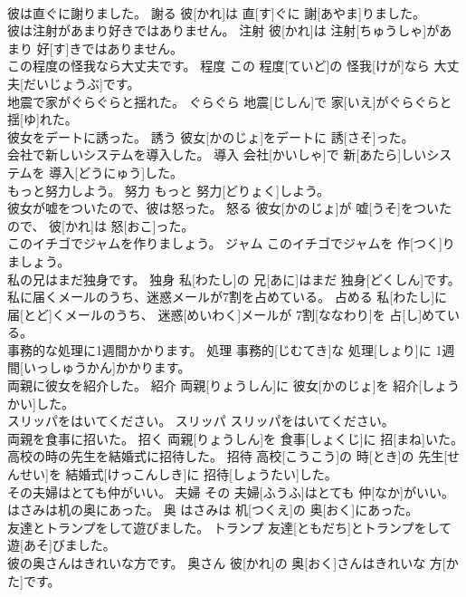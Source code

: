 \documentclass[8pt]{extreport}
\begin{document}
\begin{CJK}{UTF8}{min}
\\	彼は直ぐに謝りました。	謝る	彼[かれ]は 直[す]ぐに 謝[あやま]りました。	
\\	彼は注射があまり好きではありません。	注射	彼[かれ]は 注射[ちゅうしゃ]があまり 好[す]きではありません。	
\\	この程度の怪我なら大丈夫です。	程度	この 程度[ていど]の 怪我[けが]なら 大丈夫[だいじょうぶ]です。	
\\	地震で家がぐらぐらと揺れた。	ぐらぐら	地震[じしん]で 家[いえ]がぐらぐらと 揺[ゆ]れた。	
\\	彼女をデートに誘った。	誘う	彼女[かのじょ]をデートに 誘[さそ]った。	
\\	会社で新しいシステムを導入した。	導入	会社[かいしゃ]で 新[あたら]しいシステムを 導入[どうにゅう]した。	
\\	もっと努力しよう。	努力	もっと 努力[どりょく]しよう。	
\\	彼女が嘘をついたので、彼は怒った。	怒る	彼女[かのじょ]が 嘘[うそ]をついたので、 彼[かれ]は 怒[おこ]った。	
\\	このイチゴでジャムを作りましょう。	ジャム	このイチゴでジャムを 作[つく]りましょう。	
\\	私の兄はまだ独身です。	独身	私[わたし]の 兄[あに]はまだ 独身[どくしん]です。	
\\	私に届くメールのうち、迷惑メールが7割を占めている。	占める	私[わたし]に 届[とど]くメールのうち、 迷惑[めいわく]メールが 7割[ななわり]を 占[し]めている。	
\\	事務的な処理に1週間かかります。	処理	事務的[じむてき]な 処理[しょり]に 1週間[いっしゅうかん]かかります。	
\\	両親に彼女を紹介した。	紹介	両親[りょうしん]に 彼女[かのじょ]を 紹介[しょうかい]した。	
\\	スリッパをはいてください。	スリッパ	スリッパをはいてください。	
\\	両親を食事に招いた。	招く	両親[りょうしん]を 食事[しょくじ]に 招[まね]いた。	
\\	高校の時の先生を結婚式に招待した。	招待	高校[こうこう]の 時[とき]の 先生[せんせい]を 結婚式[けっこんしき]に 招待[しょうたい]した。	
\\	その夫婦はとても仲がいい。	夫婦	その 夫婦[ふうふ]はとても 仲[なか]がいい。	
\\	はさみは机の奥にあった。	奥	はさみは 机[つくえ]の 奥[おく]にあった。	
\\	友達とトランプをして遊びました。	トランプ	友達[ともだち]とトランプをして 遊[あそ]びました。	
\\	彼の奥さんはきれいな方です。	奥さん	彼[かれ]の 奥[おく]さんはきれいな 方[かた]です。	

\end{CJK}
\end{document}
